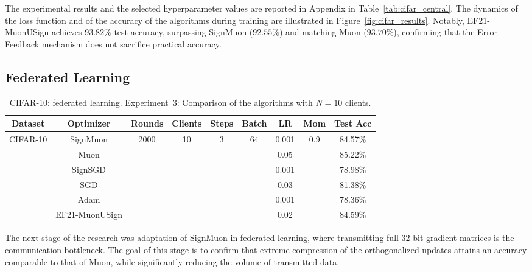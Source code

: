 \documentclass[letterpaper]{article} %
\begin{document}
The experimental results and the selected hyperparameter values are reported in Appendix in Table~\ref{tab:cifar_central}. The dynamics of the loss function and of the accuracy of the algorithms during training are illustrated in Figure~\ref{fig:cifar_results}. Notably, EF21-MuonUSign achieves $93.82\%$ test accuracy, surpassing SignMuon ($92.55\%$) and matching Muon ($93.70\%$), confirming that the Error-Feedback mechanism does not sacrifice practical accuracy.

\subsection{Federated Learning}
\begin{table}[!t]
\centering
\small
\renewcommand{\arraystretch}{1.2}
\begin{tabular}{|c|c|c|c|c|c|c|c|c|}
\hline
\textbf{Dataset} & \textbf{Optimizer} & \textbf{Rounds} & \textbf{Clients} & \textbf{Steps} & \textbf{Batch} & \textbf{LR} & \textbf{Mom} & \textbf{Test Acc} \\
\hline
\multirow{6}{*}{CIFAR-10} & SignMuon & \multirow{6}{*}{2000} & \multirow{6}{*}{10} & \multirow{6}{*}{3} & \multirow{6}{*}{64} & 0.001 & \multirow{6}{*}{0.9} & 84.57\% \\
\cline{2-2} \cline{7-7} \cline{9-9}
 & Muon & & & & & 0.05 & & 85.22\% \\
\cline{2-2} \cline{7-7} \cline{9-9}
 & SignSGD & & & & & 0.001 & & 78.98\% \\
\cline{2-2} \cline{7-7} \cline{9-9}
 & SGD & & & & & 0.03 & & 81.38\% \\
\cline{2-2} \cline{7-7} \cline{9-9}
 & Adam & & & & & 0.001 & & 78.36\% \\
\cline{2-2} \cline{7-7} \cline{9-9}
 & EF21-MuonUSign & & & & & 0.02 & & 84.59\% \\
\hline
\end{tabular}
\caption{CIFAR-10: federated learning. Experiment~3: Comparison of the algorithms with $N=10$ clients.}
\label{tab:exp_3}
\end{table}

The next stage of the research was adaptation of SignMuon in federated learning, where transmitting full 32-bit gradient matrices is the communication bottleneck. The goal of this stage is to confirm that extreme compression of the orthogonalized updates attains an accuracy comparable to that of Muon, while significantly reducing the volume of transmitted data.
\end{document}
